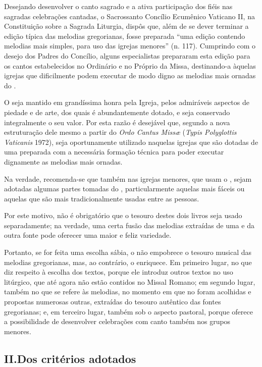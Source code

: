  Desejando desenvolver o canto sagrado e a ativa participação dos fiéis nas sagradas celebrações cantadas, o Sacrossanto Concílio Ecumênico Vaticano II, na Constituição sobre a Sagrada Liturgia, dispôs que, além de se dever terminar a edição típica das melodias gregorianas, fosse preparada ``uma edição contendo melodias mais simples, para uso das igrejas menores'' (n. 117). Cumprindo com o desejo dos Padres do Concílio, alguns especialistas prepararam esta edição para os cantos estabelecidos no  Ordinário e no Próprio da Missa, destinando-a àquelas igrejas que dificilmente podem executar de modo digno as melodias mais ornadas do {\GR}.

 O {\GR} seja mantido em grandíssima honra pela Igreja, pelos admiráveis aspectos de piedade e de arte, dos quais é abundantemente dotado, e seja conservado integralmente o seu valor. Por esta razão é desejável que, segundo a nova estruturação dele mesmo a partir do \emph{Ordo Cantus Missæ} (\emph{Typis Polyglottis Vaticanis} 1972), seja oportunamente utilizado naquelas igrejas que são dotadas de uma {\ScholaC} preparada com a necessária formação técnica para poder executar dignamente as melodias mais ornadas.

Na verdade, recomenda-se que também nas igrejas menores, que usam o {\GS}, sejam  adotadas algumas partes tomadas do {\GR}, particularmente aquelas mais fáceis ou aquelas que são mais tradicionalmente usadas entre as pessoas.

 Por este motivo, não é obrigatório que o tesouro destes dois livros seja usado separadamente; na verdade, uma certa fusão das melodias extraídas de uma e da outra fonte pode oferecer uma maior e feliz variedade.

 Portanto, se for feita uma escolha sábia, o {\GS} não empobrece o tesouro musical das melodias gregorianas, mas, ao contrário, o enriquece. Em primeiro lugar, no que diz respeito à escolha dos textos, porque ele introduz outros textos no uso litúrgico, que até agora não estão contidos no Missal Romano; em segundo lugar, também no que se refere às melodias, no momento em que no {\GS} foram acolhidas e propostas numerosas outras, extraídas do tesouro autêntico das fontes gregorianas; e, em terceiro lugar, também sob o aspecto pastoral, porque oferece a possibilidade de desenvolver celebrações com canto também nos grupos menores.

\subsection{II.\@ Dos critérios adotados}\label{subsection:praenotanda-2}

